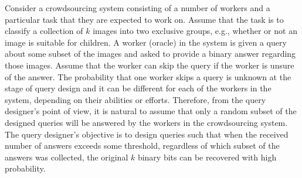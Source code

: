 \documentclass[11pt,onecolumn]{IEEEtran}
\begin{document}
Consider a crowdsourcing system consisting of a number of workers and a particular task that they are expected to work on. 
Assume that the task is to classify a collection of $k$ images into two exclusive groups, e.g., whether or not an image is suitable for children.
A worker (oracle) in the system is given a query about some subset of the images and asked to provide a binary answer regarding those images. 
Assume that the worker can skip the query if the worker is unsure of the answer. The probability that one worker skips a query is unknown at the stage of query design and it can be different for each of the workers in the system, depending on their abilities or efforts. 
Therefore, from the query designer's point of view, it is natural to assume that only a random subset of the designed queries will be answered by the workers in the crowdsourcing system. The query designer's objective is to design queries such that when the received number of answers exceeds some threshold, regardless of which subset of the answers was collected, the original $k$ binary bits can be recovered with high probability. 
\end{document}
